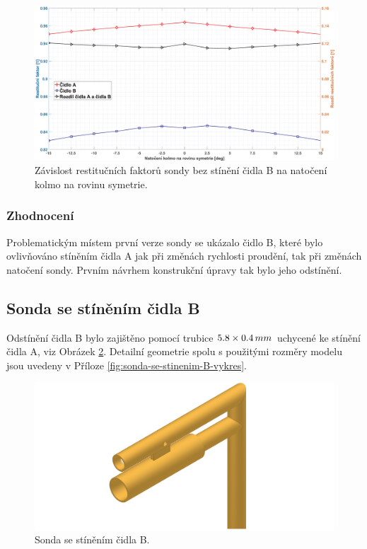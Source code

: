              \begin{figure}[ht!]
                \centering
                \includegraphics*[width=\textwidth]{400_SIMULACE_KONSTRUKCNICH_UPRAV/Grafy/01_kolma_rovina}
                \caption{Závislost restitučních faktorů sondy bez stínění čidla B na natočení kolmo na rovinu symetrie.}
                \label{fig:sonda-bez-stineni-kolma-rovina}
            \end{figure}

        \subsubsection{Zhodnocení}
            Problematickým místem první verze sondy se ukázalo čidlo B, které bylo ovlivňováno stíněním čidla A jak při změnách rychlosti proudění, tak při změnách natočení sondy. Prvním návrhem konstrukční úpravy tak bylo jeho odstínění.
    \newpage
    \subsection{Sonda se stíněním čidla B} \label{sec:sonda-se-stinenim-B}
        Odstínění čidla B bylo zajištěno pomocí trubice $5.8 \times 0.4 \, mm$ uchycené ke stínění čidla A, viz Obrázek \ref{fig:sonda-se-stinenim-B}. Detailní geometrie spolu s použitými rozměry modelu jsou uvedeny v Příloze \ref{fig:sonda-se-stinenim-B-vykres}. 
        
        \begin{figure}[ht!]
            \centering
            \includegraphics[width=\textwidth]{400_SIMULACE_KONSTRUKCNICH_UPRAV/Vykresy_rendery/Sonda_se_stinenim_B.png}
            \caption{Sonda se stíněním čidla B.}
            \label{fig:sonda-se-stinenim-B}
        \end{figure}

